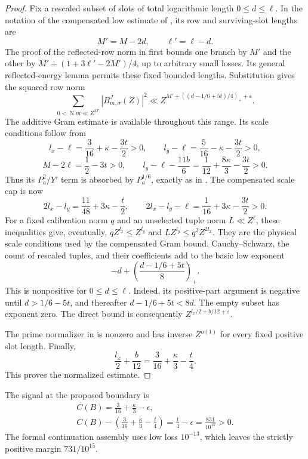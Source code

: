 \documentclass[11pt]{article}
\newcommand{\NF}{\operatorname{N}}
\begin{document}
\begin{proof}
Fix a rescaled subset of slots of total logarithmic length
$0\le d\le\ell$. In the notation of the compensated low estimate of
\cite{OAI}, its row and surviving-slot lengths are
\[
 M'=M-2d,\qquad \ell'=\ell-d.
\]
The proof of the reflected-row norm in \cite[Part II, compensated low estimate]{OAI}
first bounds one branch by $M'$ and the other by
$M'+(1+3\ell'-2M')/4$, up to arbitrary small losses. Its general
reflected-energy lemma permits these fixed bounded lengths. Substitution
gives the squared row norm
\begin{equation}\label{eq:row}
 \sum_{0<\NF m\ll Z^{M'}} |B^J_{m,\sigma}(Z)|^2
 \ll Z^{M'+((d-1/6+5t)/4)_++\varepsilon}.
\end{equation}
The additive Gram estimate is available throughout this range. Its scale
conditions follow from
\[
 l_x-\ell=\frac3{16}+\kappa-\frac{3t}{2}>0,\qquad
 l_y-\ell=\frac5{16}-\kappa-\frac{3t}{2}>0,
\]
\[
 M-2\ell=\frac12-3t>0,\qquad
 l_y-\ell-\frac{11b}{6}
   =\frac1{12}+\frac{8\kappa}{3}-\frac{3t}{2}>0.
\]
Thus its $P_a^2/Y'$ term is absorbed by $P_a^{1/6}$, exactly as in
\cite[Part II, additive Gram bound]{OAI}.
The compensated scale cap is now
\[
 2l_x-l_y=\frac{11}{48}+3\kappa-\frac t2,
 \qquad
 2l_x-l_y-\ell=\frac1{16}+3\kappa-\frac{3t}{2}>0.
\]
For a fixed calibration norm $q$ and an unselected tuple norm
$L\ll Z^\ell$, these inequalities give, eventually,
$qZ^{l_x}\le Z^{l_y}$ and
$LZ^{l_y}\le q^2Z^{2l_x}$.
They are the physical scale conditions used by the compensated Gram bound.
Cauchy--Schwarz, the count of
rescaled tuples, and their coefficients add to the basic low exponent
\[
 -d+\left(\frac{d-1/6+5t}{8}\right)_+.
\]
This is nonpositive for $0\le d\le\ell$. Indeed, its positive-part
argument is negative until $d>1/6-5t$, and thereafter
$d-1/6+5t<8d$. The empty subset has exponent zero. The direct bound
is consequently $Z^{l_x/2+b/12+\varepsilon}$.

The prime normalizer in \cite[Part II, principal normalizer]{OAI} is nonzero and has
inverse $Z^{o(1)}$ for every fixed positive slot length. Finally,
\[
 \frac{l_x}{2}+\frac b{12}
 =\frac3{16}+\frac\kappa3-\frac t4.
\]
This proves the normalized estimate.
\end{proof}

The signal at the proposed boundary is
\begin{equation}\label{eq:low-gap}
 \begin{gathered}
 C(B)=\frac3{16}+\frac\kappa3-\epsilon,\\
 C(B)-\left(\frac3{16}+\frac\kappa3-\frac t4\right)
 =\frac t4-\epsilon=\frac{831}{10^{15}}>0.
 \end{gathered}
\end{equation}
The formal continuation assembly uses low loss $10^{-13}$, which leaves
the strictly positive margin $731/10^{15}$.
\end{document}
